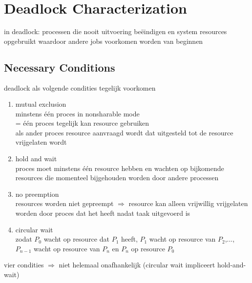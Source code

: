 \documentclass{report}
\begin{document}
\section{Deadlock Characterization}
in deadlock: processen die nooit uitvoering be\"eindigen en system resources opgebruikt waardoor andere jobs voorkomen worden van beginnen
\subsection{Necessary Conditions}
deadlock als volgende condities tegelijk voorkomen
\begin{enumerate}
\item mutual exclusion
\\minstens \'e\'en proces in nonsharable mode
\\= \'e\'en proces tegelijk kan resource gebruiken
\\als ander proces resource aanvraagd wordt dat uitgesteld tot de resource vrijgelaten wordt
\item hold and wait
\\proces moet minstens \'e\'en resource hebben en wachten op bijkomende resources die momenteel bijgehouden worden door andere processen
\item no preemption
\\resources worden niet gepreempt $\Rightarrow$ resource kan alleen vrijwillig vrijgelaten worden door proces dat het heeft nadat taak uitgevoerd is
\item circular wait
\\zodat $P_{0}$ wacht op resource dat $P_{1}$ heeft, $P_{1}$ wacht op resource van $P_{2}$,..., $P_{n-1}$ wacht op resource van $P_{n}$ en $P_{n}$ op resource $P_{0}$

\end{enumerate} 
vier condities $\Rightarrow$ niet helemaal onafhankelijk (circular wait impliceert hold-and-wait)
\end{document}
